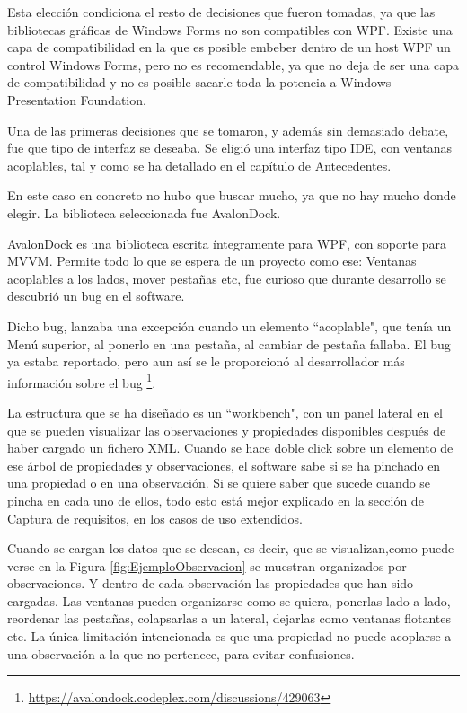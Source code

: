 Esta elecci\'on condiciona el resto de decisiones que fueron tomadas, ya que las bibliotecas gr\'aficas
de Windows Forms no son compatibles con WPF. Existe una capa de compatibilidad en la que es posible embeber dentro
de un host WPF un control Windows Forms, pero no es recomendable, ya que no deja de ser una capa de compatibilidad y
no es posible sacarle toda la potencia a Windows Presentation Foundation.

Una de las primeras decisiones que se tomaron, y adem\'as sin demasiado debate, fue que tipo de interfaz se deseaba.
Se eligi\'o una interfaz tipo IDE, con ventanas acoplables, tal y como se ha detallado en el cap\'itulo de Antecedentes.

En este caso en concreto no hubo que buscar mucho, ya que no hay mucho donde elegir. La biblioteca seleccionada
fue AvalonDock.

AvalonDock es una biblioteca escrita \'integramente para WPF, con soporte para MVVM. Permite todo lo que se espera
de un proyecto como ese: Ventanas acoplables a los lados, mover pesta\~nas etc, fue curioso que durante desarrollo se descubri\'o
un bug en el software.

Dicho bug, lanzaba una excepci\'on cuando un elemento ``acoplable", que ten\'ia un Men\'u superior, al ponerlo
en una pesta\~na, al cambiar de pesta\~na fallaba. El bug ya estaba reportado, pero aun as\'i se le proporcion\'o
al desarrollador m\'as informaci\'on sobre el bug \footnote{\url{https://avalondock.codeplex.com/discussions/429063}}.

La estructura que se ha dise\~nado es un ``workbench", con un panel lateral en el que se pueden visualizar las observaciones
y propiedades disponibles despu\'es de haber cargado un fichero XML. Cuando se hace doble click sobre un elemento
de ese \'arbol de propiedades y observaciones, el software sabe si se ha pinchado en una propiedad o en una observaci\'on.
Si se quiere saber que sucede cuando se pincha en cada uno de ellos, todo esto est\'a mejor explicado en la secci\'on de
Captura de requisitos, en los casos de uso extendidos.

Cuando se cargan los datos que se desean, es decir, que se visualizan,como puede verse en la
Figura \ref{fig:EjemploObservacion} se muestran organizados por observaciones. Y dentro de cada
observaci\'on las propiedades que han sido cargadas. Las ventanas pueden organizarse como se quiera, ponerlas lado a lado,
reordenar las pesta\~nas, colapsarlas a un lateral, dejarlas como ventanas flotantes etc. 
La \'unica limitaci\'on intencionada es que una propiedad no puede acoplarse a una observaci\'on a la que no pertenece,
para evitar confusiones.

